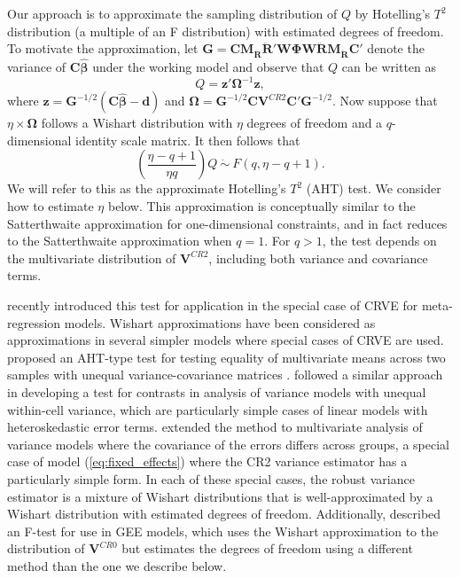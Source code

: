 \documentclass[draft]{ectaart}\usepackage[]{graphicx}\usepackage[]{color}
\newcommand{\bm}{\mathbf}
\newcommand{\bs}{\boldsymbol}
\begin{document}
Our approach is to approximate the sampling distribution of $Q$ by Hotelling's $T^2$ distribution (a multiple of an F distribution) with estimated degrees of freedom. To motivate the approximation, let $\bm{G} = \bm{C} \bm{M_{\ddot{R}}}\bm{\ddot{R}}'\bm{W}\bs\Phi\bm{W}\bm{\ddot{R}}\bm{M_{\ddot{R}}} \bm{C}'$ denote the variance of $\bm{C}\bs{\hat\beta}$ under the working model and observe that $Q$ can be written as \[
Q = \bm{z}' \bs\Omega^{-1} \bm{z},
\]
where $\bm{z} = \bm{G}^{-1/2}\left(\bm{C}\bs{\hat\beta} - \bm{d}\right)$ and $\bs\Omega = \bm{G}^{-1/2} \bm{C} \bm{V}^{CR2}\bm{C}'\bm{G}^{-1/2}$. 
Now suppose that $\eta \times \bs\Omega$ follows a Wishart distribution with $\eta$ degrees of freedom and a $q$-dimensional identity scale matrix. It then follows that
\begin{equation}
\label{eq:AHT}
\left(\frac{\eta - q + 1}{\eta q}\right) Q \ \dot\sim \ F(q, \eta - q + 1).
\end{equation}
We will refer to this as the approximate Hotelling's $T^2$ (AHT) test.
We consider how to estimate $\eta$ below.
This approximation is conceptually similar to the Satterthwaite approximation for one-dimensional constraints, and in fact reduces to the Satterthwaite approximation when $q = 1$. 
For $q > 1$, the test depends on the multivariate distribution of $\bm{V}^{CR2}$, including both variance and covariance terms. 

\citet{Tipton2015small-F} recently introduced this test for application in the special case of CRVE for meta-regression models.
Wishart approximations have been considered as approximations in several simpler models where special cases of CRVE are used.
\citet{Nel1986solution} proposed an AHT-type test for testing equality of multivariate means across two samples with unequal variance-covariance matrices \citep[i.e., the multivariate Behrens-Fisher problem; see also][]{Krishnamoorthy2004modified}.
\citet{Zhang2012twowayANOVA} followed a similar approach in developing a test for contrasts in analysis of variance models with unequal within-cell variance, which are particularly simple cases of linear models with heteroskedastic error terms. 
\citet{Zhang2012MANOVA} extended the method to multivariate analysis of variance models where the covariance of the errors differs across groups, a special case of model (\ref{eq:fixed_effects}) where the CR2 variance estimator has a particularly simple form. 
In each of these special cases, the robust variance estimator is a mixture of Wishart distributions that is well-approximated by a Wishart distribution with estimated degrees of freedom.
Additionally, \citet{Pan2002small} described an F-test for use in GEE models, which uses the Wishart approximation to the distribution of $\bm{V}^{CR0}$ but estimates the degrees of freedom using a different method than the one we describe below.
\end{document}
